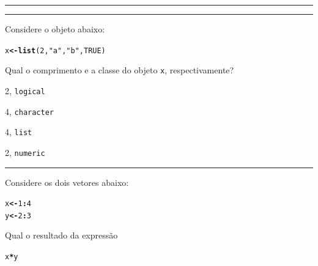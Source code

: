 \documentclass[a4paper,11pt,fleqn]{article}\usepackage[]{graphicx}\usepackage[]{color}
\makeatletter
\newcommand{\hlnum}[1]{\textcolor[rgb]{0,0,0}{#1}}%
\newcommand{\hlstr}[1]{\textcolor[rgb]{0,0,0}{#1}}%
\newcommand{\hlopt}[1]{\textcolor[rgb]{0,0,0}{\textbf{#1}}}%
\newcommand{\hlstd}[1]{\textcolor[rgb]{0,0,0}{#1}}%
\newcommand{\hlkwb}[1]{\textcolor[rgb]{0,0,0}{\textbf{#1}}}%
\newcommand{\hlkwd}[1]{\textcolor[rgb]{0,0,0}{\textbf{#1}}}%
\newenvironment{kframe}{%
 \def\at@end@of@kframe{}%
 \ifinner\ifhmode%
  \def\at@end@of@kframe{\end{minipage}}%
  \begin{minipage}{\columnwidth}%
 \fi\fi%
 \def\FrameCommand##1{\hskip\@totalleftmargin \hskip-\fboxsep
 \colorbox{shadecolor}{##1}\hskip-\fboxsep
     \hskip-\linewidth \hskip-\@totalleftmargin \hskip\columnwidth}%
 \MakeFramed {\advance\hsize-\width
   \@totalleftmargin\z@ \linewidth\hsize
   \@setminipage}}%
 {\par\unskip\endMakeFramed%
 \at@end@of@kframe}
\newenvironment{knitrout}{}{} %
\theoremstyle{definition}
\makeatother
\begin{document}
\vspace{0.3cm}
\hrule
\vspace{0.3cm}

\newpage

\vspace{0.3cm}
\hrule
\vspace{0.3cm}

\begin{compactenum}[8.]
\item Considere o objeto abaixo:
\begin{knitrout}\small
{}\color{fgcolor}\begin{kframe}
\begin{alltt}
\hlstd{x} \hlkwb{<-} \hlkwd{list}\hlstd{(}\hlnum{2}\hlstd{,} \hlstr{"a"}\hlstd{,} \hlstr{"b"}\hlstd{,} \hlnum{TRUE}\hlstd{)}
\end{alltt}
\end{kframe}
\end{knitrout}
Qual o comprimento e a classe do objeto \texttt{x}, respectivamente?
\begin{compactenum}
  \item 2, \quad \texttt{logical}
  \item 4, \quad \texttt{character}
  \item 4, \quad \texttt{list}
  \item 2, \quad \texttt{numeric}
\end{compactenum}

\end{compactenum}

\vspace{0.3cm}
\hrule
\vspace{0.3cm}

\begin{compactenum}[9.]
\item Considere os dois vetores abaixo:
\begin{knitrout}\small
{}\color{fgcolor}\begin{kframe}
\begin{alltt}
\hlstd{x} \hlkwb{<-} \hlnum{1}\hlopt{:}\hlnum{4}
\hlstd{y} \hlkwb{<-} \hlnum{2}\hlopt{:}\hlnum{3}
\end{alltt}
\end{kframe}
\end{knitrout}
Qual o resultado da expressão
\begin{knitrout}\small
{}\color{fgcolor}\begin{kframe}
\begin{alltt}
\hlstd{x} \hlopt{*} \hlstd{y}
\end{alltt}
\end{kframe}
\end{knitrout}
\begin{tabular}{| p{1cm} | p{1cm} | p{1cm} | p{1cm} | p{1cm} | p{1cm}
  | p{1cm} | p{1cm} | p{1cm} | p{1cm} |}
  \hline
  & & & & & & & & & \\
  \hline
\end{tabular}

\end{compactenum}
\end{document}

